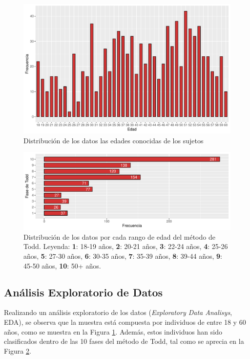 \begin{figure}[h]
    \centering
    \includegraphics[width=\linewidth]{../../scripts/eda/eda_univar/char_age_distr.pdf}
    \caption[Distribución de los datos por edad]{Distribución de los datos las edades conocidas de los sujetos}
    \label{fig4:age}
\end{figure}
\begin{figure}[h]
    \centering
    \includegraphics[width=\linewidth]{../../scripts/eda/eda_univar/char_t_phase_distr.pdf}
    \caption[Distribución de los datos por cada rango de edad]{Distribución de los datos por cada rango de edad del método de Todd. Leyenda: \textbf{1}: 18-19 años, \textbf{2}: 20-21 años, \textbf{3}: 22-24 años, \textbf{4}: 25-26 años, \textbf{5}: 27-30 años, \textbf{6}: 30-35 años, \textbf{7}: 35-39 años, \textbf{8}: 39-44 años, \textbf{9}: 45-50 años, \textbf{10}: 50+ años.}
    \label{fig4:todd_phase}
\end{figure}

\subsection{Análisis Exploratorio de Datos}
\label{section4:data_eda}
Realizando un análisis exploratorio de los datos (\textit{Exploratory Data Analisys}, EDA), se observa que la muestra está compuesta por individuos de entre 18 y 60 años, como se muestra en la Figura \ref{fig4:age}. Además, estos individuos han sido clasificados dentro de las 10 fases del método de Todd, tal como se aprecia en la Figura \ref{fig4:todd_phase}.

